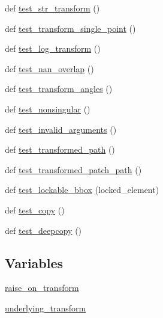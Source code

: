 \begin{DoxyCompactItemize}
def \hyperlink{namespacematplotlib_1_1tests_1_1test__transforms_ac950b699aa94047a19759b1aa9b593ba}{test\+\_\+str\+\_\+transform} ()
\item 
def \hyperlink{namespacematplotlib_1_1tests_1_1test__transforms_ab7ba79715404de853b9100dc76637aef}{test\+\_\+transform\+\_\+single\+\_\+point} ()
\item 
def \hyperlink{namespacematplotlib_1_1tests_1_1test__transforms_a903d54967342f6cdbba1890da6aed7d1}{test\+\_\+log\+\_\+transform} ()
\item 
def \hyperlink{namespacematplotlib_1_1tests_1_1test__transforms_aa164efab77a5b10f863f7c69de1f80db}{test\+\_\+nan\+\_\+overlap} ()
\item 
def \hyperlink{namespacematplotlib_1_1tests_1_1test__transforms_a0a00288a2ec8510486eb304330689261}{test\+\_\+transform\+\_\+angles} ()
\item 
def \hyperlink{namespacematplotlib_1_1tests_1_1test__transforms_a820524b8328a9a1a035aaa46c109cbce}{test\+\_\+nonsingular} ()
\item 
def \hyperlink{namespacematplotlib_1_1tests_1_1test__transforms_ab6cd1640a666e50210c3268fdf5c37cc}{test\+\_\+invalid\+\_\+arguments} ()
\item 
def \hyperlink{namespacematplotlib_1_1tests_1_1test__transforms_a2f79e4e1a398defbd9f0ec049f505ce1}{test\+\_\+transformed\+\_\+path} ()
\item 
def \hyperlink{namespacematplotlib_1_1tests_1_1test__transforms_ab94192a94d77f9281cebac3f89a01298}{test\+\_\+transformed\+\_\+patch\+\_\+path} ()
\item 
def \hyperlink{namespacematplotlib_1_1tests_1_1test__transforms_a7c099bdb31c2a38d5dcbba7fd718169a}{test\+\_\+lockable\+\_\+bbox} (locked\+\_\+element)
\item 
def \hyperlink{namespacematplotlib_1_1tests_1_1test__transforms_a62fc9a1d6e7078402de125d57ef8f2a5}{test\+\_\+copy} ()
\item 
def \hyperlink{namespacematplotlib_1_1tests_1_1test__transforms_ae7bce35104dcba34a5d32c09087c44d0}{test\+\_\+deepcopy} ()
\end{DoxyCompactItemize}
\subsection*{Variables}
\begin{DoxyCompactItemize}
\item 
\hyperlink{namespacematplotlib_1_1tests_1_1test__transforms_a33a958eadd526f4ab198f5abbcb4131a}{raise\+\_\+on\+\_\+transform}
\item 
\hyperlink{namespacematplotlib_1_1tests_1_1test__transforms_ab73ed1bad9e41d537e534a43f41d85bd}{underlying\+\_\+transform}
\end{DoxyCompactItemize}


